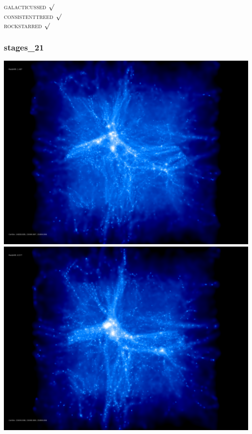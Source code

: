 \textsc{galacticussed} $\surd$ \\
\textsc{consistenttreed} $\surd$ \\ 
\textsc{rockstarred} $\surd$

% 
%
%
%
%
%
%
%


\newpage
\subsubsection{stages\_21}

\includegraphics[scale=0.1]{r256/h100/stages_21/50.jpg} 
\includegraphics[scale=0.1]{r256/h100/stages_21/100.jpg}  \\


